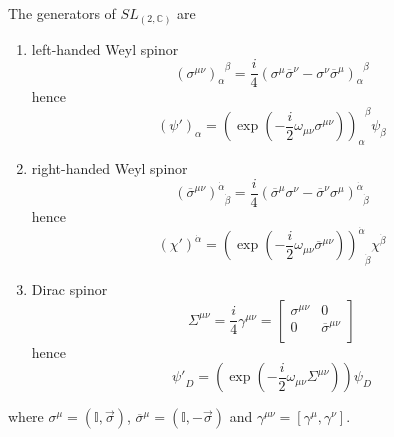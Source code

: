     The generators of $SL_(2, \mathbb C)$ are 
    \begin{enumerate}
        \item left-handed Weyl spinor 
            \begin{equation*}
                (\sigma^{\mu\nu})_\alpha^{\phantom \alpha \beta} = \frac{i}{4} (\sigma^\mu \overline \sigma^\nu - \sigma^\nu \overline \sigma^\mu)_\alpha^{\phantom \alpha \beta}
            \end{equation*}
              hence 
            \begin{equation*}
                (\psi')_\alpha = (\exp(-\frac{i}{2} \omega_{\mu\nu} \sigma^{\mu\nu}))_\alpha^{\phantom \alpha \beta} \psi_\beta
            \end{equation*}
        \item right-handed Weyl spinor 
            \begin{equation*}
                (\overline \sigma^{\mu\nu})^{\dot \alpha}_{\phantom{\dot \alpha} \dot \beta} = \frac{i}{4} (\overline \sigma^\mu \sigma^\nu - \overline \sigma^\nu  \sigma^\mu)^{\dot \alpha}_{\phantom{\dot \alpha} \dot \beta}
            \end{equation*}
              hence 
            \begin{equation*}
                (\chi')^{\dot \alpha} = (\exp(-\frac{i}{2} \omega_{\mu\nu} \overline \sigma^{\mu\nu}))^{\dot \alpha}_{\phantom{\dot \alpha} \dot \beta} \chi^{\dot \beta}
            \end{equation*}
        \item Dirac spinor 
            \begin{equation*}
                \Sigma^{\mu\nu} = \frac{i}{4} \gamma^{\mu\nu} = \begin{bmatrix}
                    \sigma^{\mu\nu} & 0 \\
                    0 & \overline \sigma^{\mu\nu} \\
                \end{bmatrix}
            \end{equation*}
              hence 
            \begin{equation*}
                {\psi'}_D = (\exp(-\frac{i}{2} \omega_{\mu\nu}  \Sigma^{\mu\nu})) \psi_D
            \end{equation*}
    \end{enumerate}
    where $\sigma^\mu = (\mathbb I, \vec \sigma)$, $\overline \sigma^\mu = (\mathbb I, - \vec \sigma)$ and $\gamma^{\mu\nu} = [\gamma^\mu, \gamma^\nu]$.

